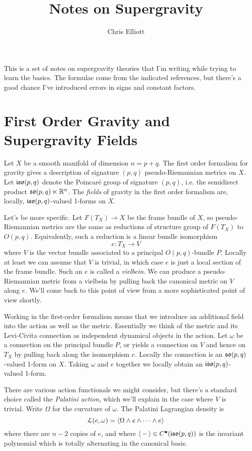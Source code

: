 \documentclass[10pt, oneside]{article}
\title{Notes on Supergravity}
\author{Chris Elliott}
\date{}
\begin{document}
\maketitle
This is a set of notes on supergravity theories that I'm writing while trying to learn the basics.  The formulae come from the indicated references, but there's a good chance I've introduced errors in signs and constant factors.

\section{First Order Gravity and Supergravity Fields}
Let $X$ be a smooth manifold of dimension $n = p+q$.  The first order formalism for gravity gives a description of signature $(p,q)$ pseudo-Riemannian metrics on $X$.  Let $\mathfrak{iso}(p,q)$ denote the Poincar\'e group of signature $(p,q)$, i.e. the semidirect product $\mathfrak{so}(p,q) \ltimes \mathbb{R}^n$.  The \emph{fields} of gravity in the first order formalism are, locally, $\mathfrak{iso}(p,q)$-valued 1-forms on $X$.

Let's be more specific.  Let $F(T_X) \to X$ be the frame bundle of $X$, so pseudo-Riemannian metrics are the same as reductions of structure group of $F(T_X)$ to $O(p,q)$.  Equivalently, such a reduction is a linear bundle isomorphism 
\[e \colon T_X \to V\]
where $V$ is the vector bundle associated to a principal $O(p,q)$-bundle $P$.  Locally at least we can assume that $V$ is trivial, in which case $e$ is just a local section of the frame bundle.  Such an $e$ is called a \emph{vielbein}.  We can produce a pseudo-Riemannian metric from a vielbein by pulling back the canonical metric on $V$ along $e$.  We'll come back to this point of view from a more sophisticated point of view shortly.

Working in the first-order formalism means that we introduce an additional field into the action as well as the metric.  Essentially we think of the metric and its Levi-Civita connection as independent dynamical objects in the action.  Let $\omega$ be a connection on the principal bundle $P$, or yields a connection on $V$ and hence on $T_X$ by pulling back along the isomorphism $e$.  Locally the connection is an $\mathfrak{so}(p,q)$-valued 1-form on $X$.  Taking $\omega$ and $e$ together we locally obtain an $\mathfrak{iso}(p,q)$-valued 1-form.

There are various action functionals we might consider, but there's a standard choice called the \emph{Palatini action}, which we'll explain in the case where $V$ is trivial.  Write $\Omega$ for the curvature of $\omega$.  The Palatini Lagrangian density is
\[\mathcal{L}(e, \omega) = \langle \Omega \wedge e \wedge \cdots \wedge e\rangle\]
where there are $n-2$ copies of $e$, and where $\langle\,-\,\rangle \in C^\bullet(\mathfrak{iso}(p,q))$ is the invariant polynomial which is totally alternating in the canonical basis.
\end{document}
